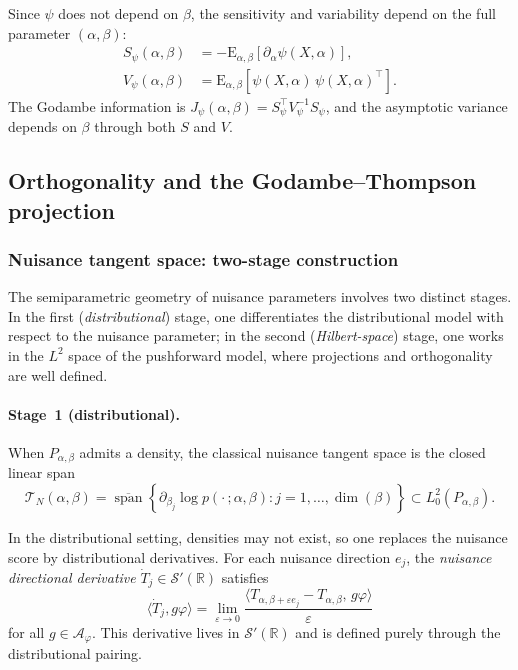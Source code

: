 \documentclass[11pt,a4paper]{article}
\newcommand{\E}{\mathrm{E}}
\newcommand{\R}{\mathbb{R}}
\begin{document}
Since $\psi$ does not depend on $\beta$, the sensitivity and variability
depend on the full parameter $(\alpha, \beta)$:
\begin{align*}
S_\psi(\alpha, \beta) &= -\E_{\alpha,\beta}[\partial_\alpha \psi(X, \alpha)], \\
V_\psi(\alpha, \beta) &= \E_{\alpha,\beta}[\psi(X, \alpha)\,\psi(X, \alpha)^\top].
\end{align*}
The Godambe information is
$J_\psi(\alpha, \beta) = S_\psi^\top V_\psi^{-1} S_\psi$,
and the asymptotic variance depends on $\beta$ through both $S$ and $V$.

\subsection{Orthogonality and the Godambe--Thompson projection}\label{subsec:orthogonality}

\subsubsection*{Nuisance tangent space: two-stage construction}

The semiparametric geometry of nuisance parameters involves two distinct
stages.  In the first (\emph{distributional}) stage, one differentiates the
distributional model with respect to the nuisance parameter; in the second
(\emph{Hilbert-space}) stage, one works in the $L^2$ space of the
pushforward model, where projections and orthogonality are well defined.

\paragraph{Stage~1 (distributional).}
When $P_{\alpha,\beta}$ admits a density, the classical nuisance tangent
space is the closed linear span
\begin{equation}\label{eq:nuisance-tangent}
\mathcal T_N(\alpha, \beta)
= \overline{\operatorname{span}}\!
\left\{
\partial_{\beta_j} \log p(\cdot\,; \alpha, \beta)
: j = 1, \ldots, \dim(\beta)
\right\}
\subset L^2_0(P_{\alpha,\beta}).
\end{equation}

In the distributional setting, densities may not exist, so one replaces
the nuisance score by distributional derivatives.  For each nuisance
direction $e_j$, the \emph{nuisance directional derivative}
$\dot T_j \in \mathcal S'(\R)$ satisfies
\[
\langle \dot T_j, g\varphi \rangle
= \lim_{\varepsilon \to 0}
\frac{\langle T_{\alpha,\beta+\varepsilon e_j} - T_{\alpha,\beta},\,
g\varphi \rangle}{\varepsilon}
\]
for all $g \in \mathcal A_\varphi$.  This derivative lives in
$\mathcal S'(\R)$ and is defined purely through the distributional pairing.
\end{document}
